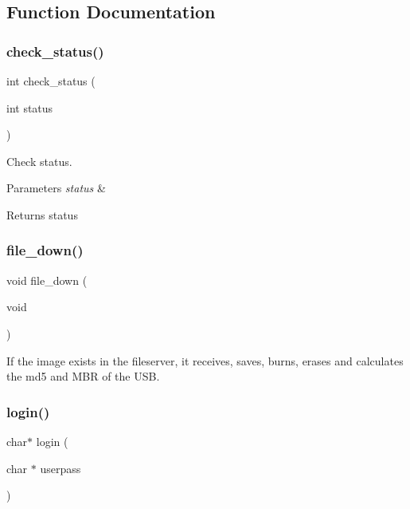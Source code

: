 \subsection{Function Documentation}
\mbox{\label{client_8c_af00002a7d3df82f54b2041a687797915}} 
\subsubsection{check\+\_\+status()}
{\footnotesize\ttfamily int check\+\_\+status (\begin{DoxyParamCaption}\item[{int}]{status }\end{DoxyParamCaption})}



Check status. 


\begin{DoxyParams}{Parameters}
{\em status} & \\
\hline
\end{DoxyParams}
\begin{DoxyReturn}{Returns}
status 
\end{DoxyReturn}
\mbox{\label{client_8c_ab03613f9e4af8de01a3ced4a764b7ffc}} 
\subsubsection{file\+\_\+down()}
{\footnotesize\ttfamily void file\+\_\+down (\begin{DoxyParamCaption}\item[{void}]{ }\end{DoxyParamCaption})}



If the image exists in the fileserver, it receives, saves, burns, erases and calculates the md5 and M\+BR of the U\+SB. 

\mbox{\label{client_8c_a0d2a952bfee88348e1792d66acf01e38}} 
\subsubsection{login()}
{\footnotesize\ttfamily char$\ast$ login (\begin{DoxyParamCaption}\item[{char $\ast$}]{userpass }\end{DoxyParamCaption})}



